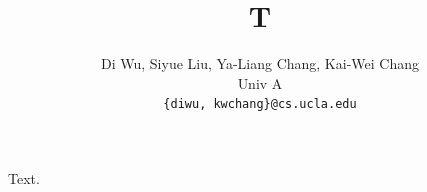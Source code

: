 \documentclass{article}
\title{T}
\author{Di Wu, Siyue Liu, Ya-Liang Chang, Kai-Wei Chang \\ Univ A \\ \texttt{\{diwu, kwchang\}@cs.ucla.edu}}
\begin{document}
\maketitle
Text.
\end{document}
